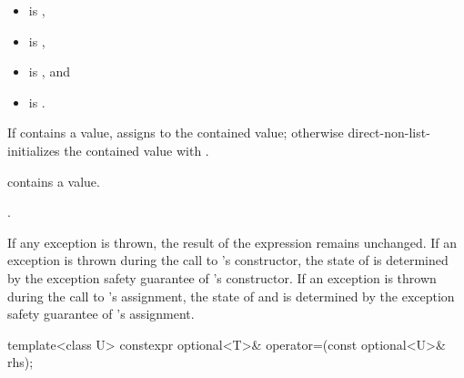 \begin{itemdescr}
\pnum
\constraints
\begin{itemize}
\item {} is ,
\item {} is ,
\item {} is , and
\item {} is .
\end{itemize}

\pnum
\effects
If  contains a value, assigns  to the contained value; otherwise direct-non-list-initializes the contained value with .

\pnum
\ensures
{} contains a value.

\pnum
\returns
{}.

\pnum
\remarks
If any exception is thrown, the result of the expression  remains unchanged. If an exception is thrown during the call to 's constructor, the state of  is determined by the exception safety guarantee of 's constructor. If an exception is thrown during the call to 's assignment, the state of  and  is determined by the exception safety guarantee of 's assignment.
\end{itemdescr}

%
\begin{itemdecl}
template<class U> constexpr optional<T>& operator=(const optional<U>& rhs);
\end{itemdecl}


